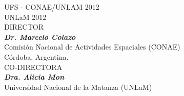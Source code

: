 \begin{titlepage}
\begin{center}
\newpage

\thispagestyle{empty}
\vspace*{1cm}
\textcopyright UFS - CONAE/UNLAM 2012\\
\textcopyright UNLaM 2012\\

\vspace*{5cm}
\normalsize DIRECTOR\\
\normalsize\textit{\textbf{Dr. Marcelo Colazo}}\\
Comisi\'on Nacional de Actividades Espaciales (CONAE)\\ Córdoba, Argentina.\\
\vspace*{3cm}
\normalsize CO-DIRECTORA\\
\normalsize \textit{\textbf{Dra. Alicia Mon}}\\
Universidad Nacional de la Matanza (UNLaM)\\ 

	
% 



\end{center}
\end{titlepage} 

\newpage
\thispagestyle{empty}
\mbox{}
